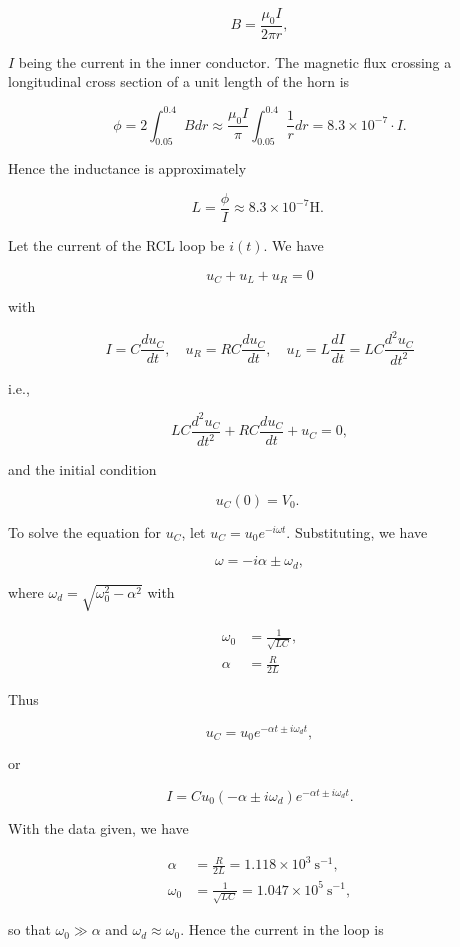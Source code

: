 \documentclass[10pt]{article}
\begin{document}
$$
B=\frac{\mu_{0} I}{2 \pi r},
$$

$I$ being the current in the inner conductor. The magnetic flux crossing a longitudinal cross section of a unit length of the horn is

$$
\phi=2 \int_{0.05}^{0.4} B d r \approx \frac{\mu_{0} I}{\pi} \int_{0.05}^{0.4} \frac{1}{r} d r=8.3 \times 10^{-7} \cdot I .
$$

Hence the inductance is approximately

$$
L=\frac{\phi}{I} \approx 8.3 \times 10^{-7} \mathrm{H} \text {. }
$$

 Let the current of the RCL loop be $i(t)$. We have

$$
u_{C}+u_{L}+u_{R}=0
$$

with

$$
I=C \frac{d u_{C}}{d t}, \quad u_{R}=R C \frac{d u_{C}}{d t}, \quad u_{L}=L \frac{d I}{d t}=L C \frac{d^{2} u_{C}}{d t^{2}}
$$

i.e.,

$$
L C \frac{d^{2} u_{C}}{d t^{2}}+R C \frac{d u_{C}}{d t}+u_{C}=0,
$$

and the initial condition

$$
u_{C}(0)=V_{0} \text {. }
$$

To solve the equation for $u_{C}$, let $u_{C}=u_{0} e^{-i \omega t}$. Substituting, we have

$$
\omega=-i \alpha \pm \omega_{d},
$$

where $\omega_{d}=\sqrt{\omega_{0}^{2}-\alpha^{2}}$ with

$$
\begin{aligned}
\omega_{0} &=\frac{1}{\sqrt{L C}}, \\
\alpha &=\frac{R}{2 L}
\end{aligned}
$$

Thus

$$
u_{C}=u_{0} e^{-\alpha t \pm i \omega_{d} t},
$$

or

$$
I=C u_{0}\left(-\alpha \pm i \omega_{d}\right) e^{-\alpha t \pm i \omega_{d} t} .
$$

With the data given, we have

$$
\begin{aligned}
\alpha &=\frac{R}{2 L}=1.118 \times 10^{3} \mathrm{~s}^{-1}, \\
\omega_{0} &=\frac{1}{\sqrt{L C}}=1.047 \times 10^{5} \mathrm{~s}^{-1},
\end{aligned}
$$

so that $\omega_{0} \gg \alpha$ and $\omega_{d} \approx \omega_{0}$. Hence the current in the loop is
\end{document}
